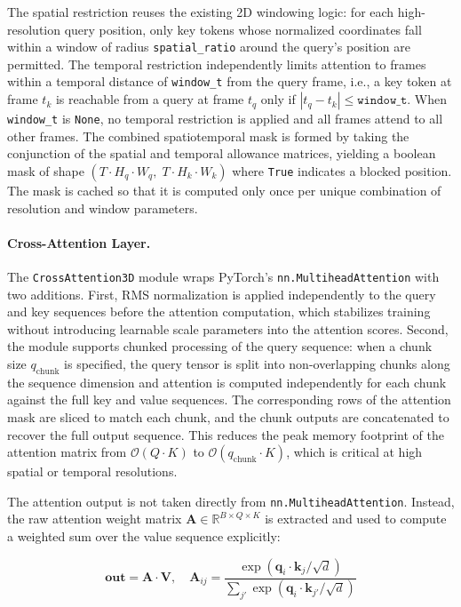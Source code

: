 The spatial restriction reuses the existing 2D windowing logic: for each high-resolution query position, only key tokens whose normalized coordinates fall within a window of radius \texttt{spatial\_ratio} around the query's position are permitted. The temporal restriction independently limits attention to frames within a temporal distance of \texttt{window\_t} from the query frame, i.e., a key token at frame $t_k$ is reachable from a query at frame $t_q$ only if $|t_q - t_k| \leq \texttt{window\_t}$. When \texttt{window\_t} is \texttt{None}, no temporal restriction is applied and all frames attend to all other frames. The combined spatiotemporal mask is formed by taking the conjunction of the spatial and temporal allowance matrices, yielding a boolean mask of shape $(T \cdot H_q \cdot W_q,\; T \cdot H_k \cdot W_k)$ where \texttt{True} indicates a blocked position. The mask is cached so that it is computed only once per unique combination of resolution and window parameters.

\paragraph{Cross-Attention Layer.}
The \texttt{CrossAttention3D} module wraps PyTorch's \texttt{nn.MultiheadAttention} with two additions. First, RMS normalization is applied independently to the query and key sequences before the attention computation, which stabilizes training without introducing learnable scale parameters into the attention scores. Second, the module supports chunked processing of the query sequence: when a chunk size $q_{\text{chunk}}$ is specified, the query tensor is split into non-overlapping chunks along the sequence dimension and attention is computed independently for each chunk against the full key and value sequences. The corresponding rows of the attention mask are sliced to match each chunk, and the chunk outputs are concatenated to recover the full output sequence. This reduces the peak memory footprint of the attention matrix from $\mathcal{O}(Q \cdot K)$ to $\mathcal{O}(q_{\text{chunk}} \cdot K)$, which is critical at high spatial or temporal resolutions.

The attention output is not taken directly from \texttt{nn.MultiheadAttention}. Instead, the raw attention weight matrix $\mathbf{A} \in \mathbb{R}^{B \times Q \times K}$ is extracted and used to compute a weighted sum over the value sequence explicitly:

\begin{equation}
    \mathbf{out} = \mathbf{A} \cdot \mathbf{V}, \quad \mathbf{A}_{ij} = \frac{\exp(\mathbf{q}_i \cdot \mathbf{k}_j / \sqrt{d})}{\sum_{j'} \exp(\mathbf{q}_i \cdot \mathbf{k}_{j'} / \sqrt{d})}
\end{equation}

